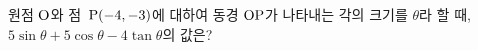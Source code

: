원점 $\mathrm{O}$와 점~$\mathrm{P}(-4{,}\mkern3mu\mathopen{}-3)$에 대하여 동경 $\mathrm{OP}$가 나타내는 각의 크기를 $\theta$라 할 때, $5\sin\theta+5\cos\theta-4\tan\theta$의 값은?
